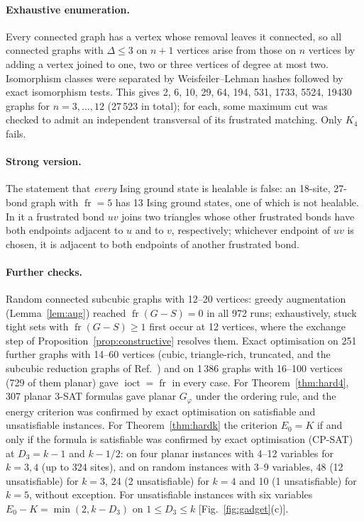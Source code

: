\documentclass[aps,pre,twocolumn,floatfix,10pt]{revtex4-2}
\theoremstyle{definition}
\theoremstyle{remark}
\newcommand{\fr}{\operatorname{fr}}
\newcommand{\ioct}{\operatorname{ioct}}
\newcommand{\OPT}{E_0}
\begin{document}
\paragraph*{Exhaustive enumeration.} Every connected graph has a vertex whose removal leaves it
connected, so all connected graphs with $\Delta\le3$ on $n+1$ vertices arise from those on $n$
vertices by adding a vertex joined to one, two or three vertices of degree at most two.
Isomorphism classes were separated by Weisfeiler--Lehman hashes followed by exact isomorphism
tests. This gives 2, 6, 10, 29, 64, 194, 531, 1733, 5524, 19430 graphs for $n=3,\dots,12$ (27\,523
in total); for each, some maximum cut was checked to admit an independent transversal of its
frustrated matching. Only $K_4$ fails.
\paragraph*{Strong version.} The statement that \emph{every} Ising ground state is healable is
false: an 18-site, 27-bond graph with $\fr=5$ has 13 Ising ground states, one of which is not
healable. In it a frustrated bond $uv$ joins two triangles whose other frustrated bonds have both
endpoints adjacent to $u$ and to $v$, respectively; whichever endpoint of $uv$ is chosen, it is
adjacent to both endpoints of another frustrated bond.
\paragraph*{Further checks.} Random connected subcubic graphs with 12--20 vertices: greedy
augmentation (Lemma~\ref{lem:aug}) reached $\fr(G-S)=0$ in all 972 runs; exhaustively, stuck
tight sets with $\fr(G-S)\ge1$ first occur at 12 vertices, where the exchange step of
Proposition~\ref{prop:constructive} resolves them. Exact optimisation on 251 further graphs with
14--60 vertices (cubic, triangle-rich, truncated, and the subcubic reduction graphs of
Ref.~\cite{Johnson2025}) and on 1\,386 graphs with 16--100 vertices (729 of them planar) gave
$\ioct=\fr$ in every case. For Theorem~\ref{thm:hard4}, 307 planar 3-SAT formulas
gave planar $G_\varphi$ under the ordering rule, and the energy criterion was confirmed by exact
optimisation on satisfiable and unsatisfiable instances. For Theorem~\ref{thm:hardk} the criterion
$\OPT=K$ if and only if the formula is satisfiable was confirmed by exact optimisation (CP-SAT) at
$D_3=k-1$ and $k-1/2$: on four planar instances with 4--12 variables for $k=3,4$ (up to 324 sites),
and on random instances with 3--9 variables, 48 (12 unsatisfiable) for $k=3$, 24 (2 unsatisfiable) for $k=4$ and 10 (1 unsatisfiable) for $k=5$, without
exception. For unsatisfiable instances with six variables $\OPT-K=\min(2,k-D_3)$ on
$1\le D_3\le k$ [Fig.~\ref{fig:gadget}(c)].
\end{document}
